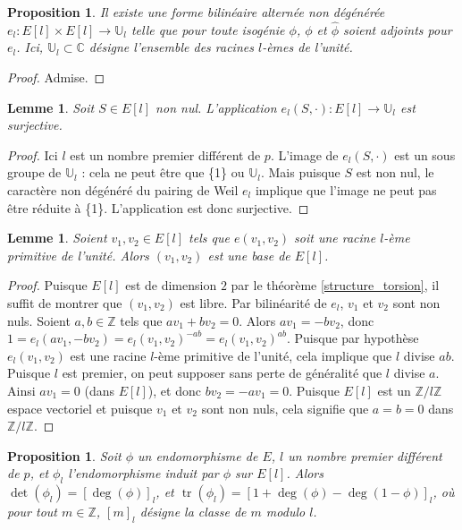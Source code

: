 \documentclass{article}
\theoremstyle{plain}%
\newtheorem{prop}[thm]{Proposition}
\newtheorem{lem}[thm]{Lemme}
\theoremstyle{definition}%
\newcommand{\Z}{\mathbb{Z}}
\newcommand{\U}{\mathbb{U}}
\newcommand{\h}{\widehat}
\DeclareMathOperator{\tr}{tr}
\begin{document}
\begin{prop}
  \label{pairing}
  Il existe une forme bilinéaire alternée non dégénérée 
  $e_l : E[l] \times E[l] \to \mathbb{U}_l$ telle que pour toute isogénie $\phi$, $\phi$ et $\h\phi$ soient adjoints pour $e_l$.
  Ici, $\mathbb{U}_l \subset \mathbb{C}$ 
  désigne l'ensemble des racines $l$-èmes de l'unité.
\end{prop}

\begin{proof}
  Admise.
\end{proof}

\begin{lem}
  \label{surj_el}
  Soit $S\in E[l]$ non nul. L'application $e_l(S,\cdot):E[l] \to \mathbb{U}_l$ est surjective.
\end{lem}

\begin{proof}
  Ici $l$ est un nombre premier différent de $p$. L'image de  $e_l(S,\cdot)$ est un sous groupe de $\mathbb{U}_l$ : cela ne peut être que \{1\} ou $\U_l$. Mais puisque $S$ est non nul, le caractère non dégénéré du pairing de Weil $e_l$ implique que l'image ne peut pas être réduite à \{1\}. L'application est donc surjective.
\end{proof}

\begin{lem}
  \label{pairing_base}
  Soient $v_1, v_2\in E[l]$ tels que $e(v_1, v_2)$ soit une racine $l$-ème primitive de l'unité. Alors $(v_1, v_2)$ est une base de $E[l]$. 
\end{lem}

\begin{proof}
  Puisque $E[l]$ est de dimension $2$ par le théorème \ref{structure_torsion}, il suffit de montrer que $(v_1, v_2)$ est libre. Par bilinéarité de $e_l$, $v_1$ et $v_2$ sont non nuls. Soient $a, b\in\Z$ tels que $av_1 + bv_2 = 0$. Alors $av_1 = -bv_2$, donc $1 = e_l(av_1, -bv_2) = e_l(v_1, v_2)^{-ab} = e_l(v_1, v_2)^{ab}$. Puisque par hypothèse $e_l(v_1, v_2)$ est une racine $l$-ème primitive de l'unité, cela implique que $l$ divise $ab$. Puisque $l$ est premier, on peut supposer sans perte de généralité que $l$ divise $a$. Ainsi $av_1 = 0$ (dans $E[l]$), et donc $bv_2=-av_1=0$. Puisque $E[l]$ est un $\Z/l\Z$ espace vectoriel et puisque $v_1$ et $v_2$ sont non nuls, cela signifie que $a=b=0$ dans $\Z/l\Z$.
\end{proof}

\begin{prop}
  \label{dettr}
  Soit $\phi$ un endomorphisme de $E$, $l$ un nombre premier différent de $p$, et $\phi_l$ l'endomorphisme induit par $\phi$ sur $E[l]$. Alors $\det(\phi_l) = [\deg(\phi)]_l$, et $\tr(\phi_l) = [1 + \deg(\phi) - \deg(1-\phi)]_l$, où pour tout $m\in\Z$, $[m]_l$ désigne la classe de $m$ modulo $l$. 
\end{prop}
\end{document}
